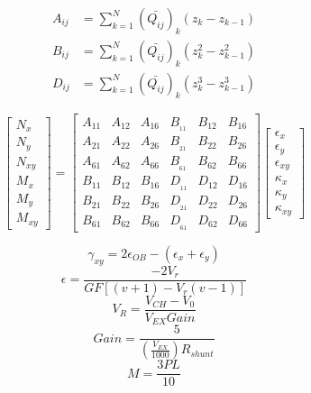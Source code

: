 \documentclass[12pt]{article}
\begin{document}
\begin{align}
A_{ij}&=\sum_{k=1}^{N}\left(\bar{Q_{ij}}\right)_k(z_{k}-z_{k-1})\\
B_{ij}&=\sum_{k=1}^{N}\left(\bar{Q_{ij}}\right)_k(z_{k}^2-z_{k-1}^2)\\
D_{ij}&=\sum_{k=1}^{N}\left(\bar{Q_{ij}}\right)_k(z_{k}^3-z_{k-1}^3)
\end{align}

\begin{equation}
\left[\begin{matrix}
N_{x}\\ N_{y} \\ N_{xy} \\ M_{x} \\ M_{y} \\ M_{xy}
\end{matrix}\right] = \left[\begin{matrix}
A_{11} & A_{12} & A_{16} & B__{11} & B_{12} & B_{16} \\ 
A_{21} & A_{22} & A_{26} & B__{21} & B_{22} & B_{26} \\
A_{61} & A_{62} & A_{66} & B__{61} & B_{62} & B_{66} \\
B_{11} & B_{12} & B_{16} & D__{11} & D_{12} & D_{16} \\
B_{21} & B_{22} & B_{26} & D__{21} & D_{22} & D_{26} \\
B_{61} & B_{62} & B_{66} & D__{61} & D_{62} & D_{66}
\end{matrix}\right] \left[\begin{matrix}
\epsilon_{x}\\ \epsilon_{y} \\ \epsilon_{xy} \\ \kappa_{x} \\ \kappa_{y} \\ \kappa_{xy} 
\end{matrix}\right]
\end{equation}

 \begin{equation}
 \gamma_{xy} = 2\epsilon_{OB} -(\epsilon_{x}+\epsilon_{y})\label{eq:45Rosette}
\end{equation}
\begin{equation}
\epsilon =\frac{-2V_{r}}{GF[(v+1)-V_{r}(v - 1)]}\label{eq:Ve}
\end{equation}
\begin{equation}
V_{R} = \frac{V_{CH}-V_{0}}{V_{EX} Gain}\label{eq:Vr}
\end{equation}
\begin{equation}
Gain = \frac{5}{(\frac{V_{EX}}{1000}){R_{shunt}}}\label{eq:gain}
\end{equation}
\begin{equation}
M = \frac{3PL}{10}\label{eq:moment}
\end{equation}




\end{document}
